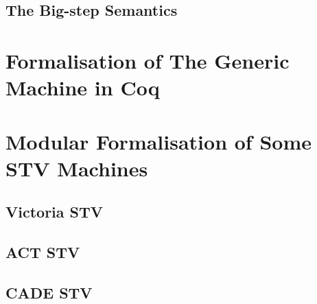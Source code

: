 \documentclass{llncs}
\begin{document}

\subsection{The Big-step Semantics}
\section{Formalisation of The Generic Machine in Coq}
\section{Modular Formalisation of Some STV Machines}
\subsection{Victoria STV}
\subsection{ACT STV}
\subsection{CADE STV}
\end{document}
